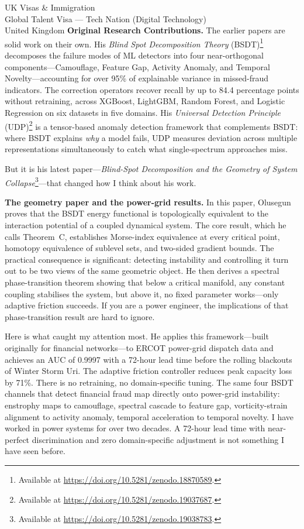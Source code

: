 \documentclass[12pt,a4paper]{letter}
\begin{document}
\begin{letter}{UK Visas \& Immigration\\
Global Talent Visa --- Tech Nation (Digital Technology)\\
United Kingdom}
\textbf{Original Research Contributions.} The earlier papers are solid work on their own. His \textit{Blind Spot Decomposition Theory} (BSDT)\footnote{Available at \url{https://doi.org/10.5281/zenodo.18870589}.} decomposes the failure modes of ML detectors into four near-orthogonal components---Camouflage, Feature Gap, Activity Anomaly, and Temporal Novelty---accounting for over 95\% of explainable variance in missed-fraud indicators. The correction operators recover recall by up to 84.4 percentage points without retraining, across XGBoost, LightGBM, Random Forest, and Logistic Regression on six datasets in five domains. His \textit{Universal Detection Principle} (UDP)\footnote{Available at \url{https://doi.org/10.5281/zenodo.19037687}.} is a tensor-based anomaly detection framework that complements BSDT: where BSDT explains \textit{why} a model fails, UDP measures deviation across multiple representations simultaneously to catch what single-spectrum approaches miss.

But it is his latest paper---\textit{Blind-Spot Decomposition and the Geometry of System Collapse}\footnote{Available at \url{https://doi.org/10.5281/zenodo.19038783}.}---that changed how I think about his work.

\textbf{The geometry paper and the power-grid results.} In this paper, Olusegun proves that the BSDT energy functional is topologically equivalent to the interaction potential of a coupled dynamical system. The core result, which he calls Theorem~C, establishes Morse-index equivalence at every critical point, homotopy equivalence of sublevel sets, and two-sided gradient bounds. The practical consequence is significant: detecting instability and controlling it turn out to be two views of the same geometric object. He then derives a spectral phase-transition theorem showing that below a critical manifold, any constant coupling stabilises the system, but above it, no fixed parameter works---only adaptive friction succeeds. If you are a power engineer, the implications of that phase-transition result are hard to ignore.

Here is what caught my attention most. He applies this framework---built originally for financial networks---to ERCOT power-grid dispatch data and achieves an AUC of 0.9997 with a 72-hour lead time before the rolling blackouts of Winter Storm Uri. The adaptive friction controller reduces peak capacity loss by 71\%. There is no retraining, no domain-specific tuning. The same four BSDT channels that detect financial fraud map directly onto power-grid instability: enstrophy maps to camouflage, spectral cascade to feature gap, vorticity-strain alignment to activity anomaly, temporal acceleration to temporal novelty. I have worked in power systems for over two decades. A 72-hour lead time with near-perfect discrimination and zero domain-specific adjustment is not something I have seen before.


\end{letter}
\end{document}
